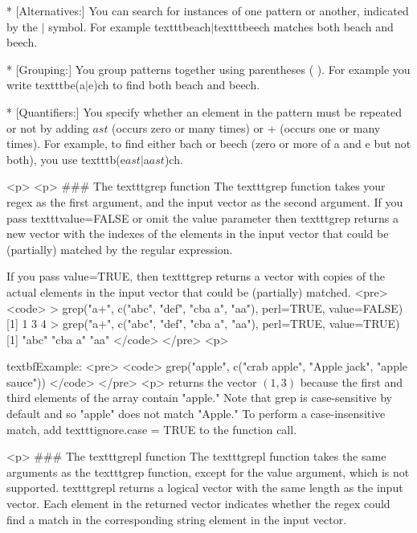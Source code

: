  
        * [Alternatives:] You can search for instances of one pattern or another, indicated by the $|$ symbol. For example texttt{beach}$|$texttt{beech} matches both beach and beech.


        * [Grouping:] You group patterns together using parentheses ( ). For example you write texttt{be(a$|$e)ch} to find both beach and beech.

        * [Quantifiers:] You specify whether an element in the pattern must be repeated or not by adding $ast$ (occurs zero or many times) or + (occurs one or many times). For example, to find either bach or beech (zero or more of a and e but not both), you use texttt{b(e$ast |$a$ast$)ch}.


<p>
<p>
### {The texttt{grep} function }
The texttt{grep} function takes your regex as the first argument, and the input vector as the second argument. If you pass texttt{value=FALSE} or omit the value parameter then texttt{grep}  returns a new vector with the indexes of the elements in the input vector that could be (partially) matched by the regular expression. 

If you pass value=TRUE, then texttt{grep}  returns a vector with copies of the actual elements in the input vector that could be (partially) matched.
<pre>
<code>
> grep("a+", c("abc", "def", "cba a", "aa"), perl=TRUE, value=FALSE)
[1] 1     3       4
> grep("a+", c("abc", "def", "cba a", "aa"), perl=TRUE, value=TRUE)
[1] "abc" "cba a" "aa"
</code>
</pre>
<p>

textbf{Example:}
<pre>
<code>
grep("apple", c("crab apple", "Apple jack", "apple sauce"))
</code>
</pre>
<p>
returns the vector $(1, 3)$ because the first and third elements of the array contain "apple." Note that grep is case-sensitive by default and so "apple" does not match "Apple." To perform a case-insensitive match, add texttt{ignore.case = TRUE} to the function call.

<p>
### {The texttt{grepl} function }
The texttt{grepl} function takes the same arguments as the texttt{grep}  function, except for the value argument, which is not supported. texttt{grepl} returns a logical vector with the same length as the input vector. Each element in the returned vector indicates whether the regex could find a match in the corresponding string element in the input vector.

